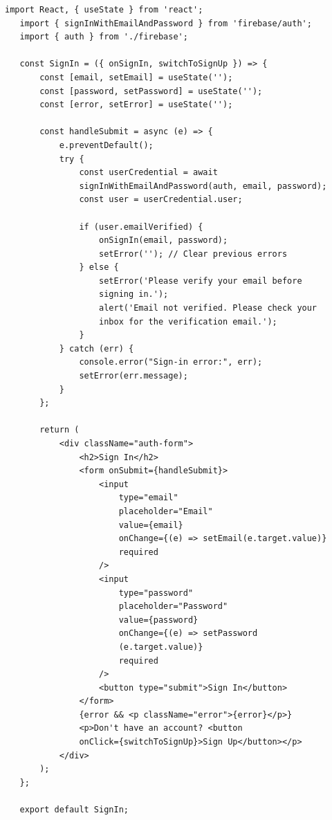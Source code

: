 \documentclass[12pt,a4paper]{report}
\begin{document}
\begin{lstlisting}[caption=Frontend Code Snippet]
   import React, { useState } from 'react';
   import { signInWithEmailAndPassword } from 'firebase/auth';
   import { auth } from './firebase';
   
   const SignIn = ({ onSignIn, switchToSignUp }) => {
       const [email, setEmail] = useState('');
       const [password, setPassword] = useState('');
       const [error, setError] = useState('');
   
       const handleSubmit = async (e) => {
           e.preventDefault();
           try {
               const userCredential = await 
               signInWithEmailAndPassword(auth, email, password);
               const user = userCredential.user;
   
               if (user.emailVerified) {
                   onSignIn(email, password);
                   setError(''); // Clear previous errors
               } else {
                   setError('Please verify your email before 
                   signing in.');
                   alert('Email not verified. Please check your 
                   inbox for the verification email.');
               }
           } catch (err) {
               console.error("Sign-in error:", err);
               setError(err.message);
           }
       };
   
       return (
           <div className="auth-form">
               <h2>Sign In</h2>
               <form onSubmit={handleSubmit}>
                   <input 
                       type="email" 
                       placeholder="Email" 
                       value={email} 
                       onChange={(e) => setEmail(e.target.value)} 
                       required 
                   />
                   <input 
                       type="password" 
                       placeholder="Password" 
                       value={password} 
                       onChange={(e) => setPassword
                       (e.target.value)} 
                       required 
                   />
                   <button type="submit">Sign In</button>
               </form>
               {error && <p className="error">{error}</p>}
               <p>Don't have an account? <button 
               onClick={switchToSignUp}>Sign Up</button></p>
           </div>
       );
   };
   
   export default SignIn;
   
   \end{lstlisting}
\end{document}
